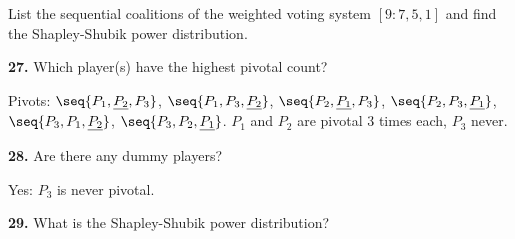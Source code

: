 \documentclass[12pt]{ximera}
\begin{document}
\begin{problem}
List the sequential coalitions of the weighted voting system $[9:7,5,1]$ and find the Shapley-Shubik power distribution.

\begin{prompt}
\textbf{27.} Which player(s) have the highest pivotal count?
\begin{multipleChoice}
\end{multipleChoice}
\begin{feedback}
Pivots: $\seq{P_1,\underline{P_2},P_3}$, $\seq{P_1,P_3,\underline{P_2}}$,
$\seq{P_2,\underline{P_1},P_3}$, $\seq{P_2,P_3,\underline{P_1}}$, $\seq{P_3,P_1,\underline{P_2}}$,
$\seq{P_3,P_2,\underline{P_1}}$. $P_1$ and $P_2$ are pivotal $3$ times each, $P_3$ never.
\end{feedback}
\end{prompt}

\begin{prompt}
\textbf{28.} Are there any dummy players?
\begin{multipleChoice}
\end{multipleChoice}
\begin{feedback}
Yes: $P_3$ is never pivotal.
\end{feedback}
\end{prompt}

\begin{prompt}
\textbf{29.} What is the Shapley-Shubik power distribution?
\begin{multipleChoice}
\end{multipleChoice}
\end{prompt}
\end{problem}
\end{document}
